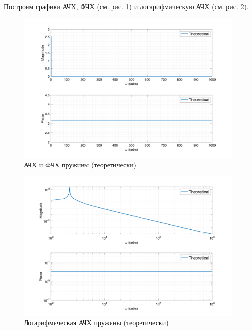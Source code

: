 Построим графики АЧХ, ФЧХ (см. рис. \ref{fig:task4_freq_resp_eq_lin}) и логарифмическую АЧХ (см. рис. \ref{fig:task4_freq_resp_eq_loglog}).
\begin{figure}[ht!]
    \centering
    \includegraphics[width=\textwidth]{media/plots/task4_freq_resp_eq_lin.png}
    \caption{АЧХ и ФЧХ пружины (теоретически)}
    \label{fig:task4_freq_resp_eq_lin}
\end{figure}
\begin{figure}[ht!]
    \centering
    \includegraphics[width=\textwidth]{media/plots/task4_freq_resp_eq_loglog.png}
    \caption{Логарифмическая АЧХ пружины (теоретически)}
    \label{fig:task4_freq_resp_eq_loglog}
\end{figure}

